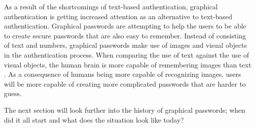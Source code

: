   As a result of the shortcomings of text-based authentication, graphical authentication is getting increased attention as an alternative to text-based authentication. Graphical passwords are attempting to help the users to be able to create secure passwords that are also easy to remember. Instead of consisting of text and numbers, graphical passwords make use of images and visual objects in the authentication process. When comparing the use of text against the use of visual objects, the human brain is more capable of remembering images than text \cite{DeAngeli}. As a consequence of humans being more capable of recognizing images, users will be more capable of creating more complicated passwords that are harder to guess.

  The next section will look further into the history of graphical passwords; when did it all start and what does the situation look like today?
  